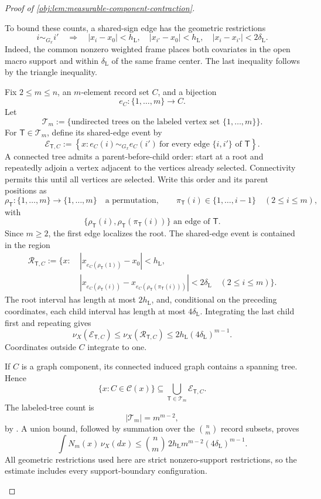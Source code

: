 \begin{proof}[Proof of \cref{obj:lem:measurable-component-contraction}]
\begin{enumerate}
To bound these counts, a shared-sign edge has the geometric restrictions
\[
i\sim_{G_x}i'
\quad\Longrightarrow\quad
|x_i-x_0|<h_{\mathrm L},
\quad
|x_{i'}-x_0|<h_{\mathrm L},
\quad
|x_i-x_{i'}|<2\delta_{\mathrm L}.
\]
Indeed, the common nonzero weighted frame places both covariates in the open macro support and within \(\delta_{\mathrm L}\) of the same frame center. The last inequality follows by the triangle inequality.

Fix \(2\le m\le n\), an \(m\)-element record set \(C\), and a bijection
\[
e_C:\{1,\ldots,m\}\longrightarrow C.
\]
Let
\[
\mathscr T_m
:=\{\text{undirected trees on the labeled vertex set }\{1,\ldots,m\}\}.
\]
For \(\mathsf T\in\mathscr T_m\), define its shared-edge event by
\[
\mathcal E_{\mathsf T,C}
:=
\left\{
x:
e_C(i)\sim_{G_x}e_C(i')
\ \text{for every edge }\{i,i'\}\text{ of }\mathsf T
\right\}.
\]
A connected tree admits a parent-before-child order: start at a root and repeatedly adjoin a vertex adjacent to the vertices already selected. Connectivity permits this until all vertices are selected. Write this order and its parent positions as
\[
\rho_{\mathsf T}:\{1,\ldots,m\}\longrightarrow\{1,\ldots,m\}
\quad\text{a permutation},
\qquad
\pi_{\mathsf T}(i)\in\{1,\ldots,i-1\}
\quad(2\le i\le m),
\]
with
\[
\{\rho_{\mathsf T}(i),\rho_{\mathsf T}(\pi_{\mathsf T}(i))\}
\text{ an edge of }\mathsf T.
\]
Since \(m\ge2\), the first edge localizes the root. The shared-edge event is contained in the region
\[
\begin{split}
\mathcal R_{\mathsf T,C}:=\bigl\{x:\ &
|x_{e_C(\rho_{\mathsf T}(1))}-x_0|<h_{\mathrm L},\\
&
|x_{e_C(\rho_{\mathsf T}(i))}
 -x_{e_C(\rho_{\mathsf T}(\pi_{\mathsf T}(i)))}
 |<2\delta_{\mathrm L}
\quad(2\le i\le m)\bigr\}.
\end{split}
\]
The root interval has length at most \(2h_{\mathrm L}\), and, conditional on the preceding coordinates, each child interval has length at most \(4\delta_{\mathrm L}\). Integrating the last child first and repeating gives
\[
\nu_X(\mathcal E_{\mathsf T,C})
\le\nu_X(\mathcal R_{\mathsf T,C})
\le2h_{\mathrm L}(4\delta_{\mathrm L})^{m-1}.
\]
Coordinates outside \(C\) integrate to one.

If \(C\) is a graph component, its connected induced graph contains a spanning tree. Hence
\[
\{x:C\in\mathscr C(x)\}
\subseteq
\bigcup_{\mathsf T\in\mathscr T_m}\mathcal E_{\mathsf T,C}.
\]
The labeled-tree count is
\[
|\mathscr T_m|=m^{m-2},
\]
by \citep[Section 5.6, Theorem 5.40]{KellerTrotterAppliedCombinatorics}. A union bound, followed by summation over the \(\binom nm\) record subsets, proves
\[
\int N_m(x)\,\nu_X(dx)
\le
\binom nm\,2h_{\mathrm L}m^{m-2}
 (4\delta_{\mathrm L})^{m-1}.
\]
All geometric restrictions used here are strict nonzero-support restrictions, so the estimate includes every support-boundary configuration.


\end{enumerate}
\end{proof}
